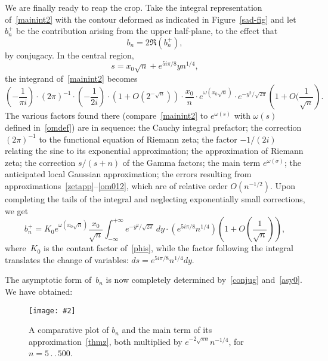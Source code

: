\documentclass{amsart}
\newcommand{\Img}[2]{\texttt{[image: \#2]}}
\begin{document}
We are finally ready to reap the crop. Take the integral representation
of~\eqref{mainint2} with the contour deformed as indicated in Figure~\ref{sad-fig} and
let $b_n^{+}$ be the contribution arising from the upper half-plane, to
the effect that
\begin{equation}\label{conjug}
b_n=2\Re(b_n^+),
\end{equation}
by conjugacy. In the central region, 
\[
s=x_0\sqrt{n}+e^{5i\pi/8}yn^{1/4},
\]
the integrand of~\eqref{mainint2} becomes
\begin{equation}\label{phis}
\left(-\frac{1}{\pi i}\right)\cdot 
(2\pi)^{-1}\cdot 
\left(-\frac{1}{2i}\right)\cdot
 \left(1+O(2^{-\sqrt{n}})\right)\cdot 
\frac{x_0}{n} \cdot e^{\omega(x_0\sqrt{n})} \cdot
e^{-y^2/\sqrt{2\pi}}\left(1+O(\frac{1}{\sqrt{n}}\right).
\end{equation}
The various factors found there (compare~\eqref{mainint2} to $e^{\omega(s)}$
with $\omega(s)$ defined in~\eqref{omdef})
are in sequence: the Cauchy integral prefactor; 
the correction $(2\pi)^{-1}$ to the functional equation of Riemann zeta;
the factor $-1/(2i)$ relating the sine to its
exponential approximation; the approximation of Riemann zeta;
the correction $s/(s+n)$ of the Gamma factors; 
the main term $e^{\omega(\sigma)}$;
the anticipated local Gaussian approximation;
the errors resulting from approximations~\eqref{zetapp}--\eqref{om012},
which are of relative order $O(n^{-1/2})$. Upon completing the tails of the 
integral and neglecting exponentially small corrections,
we get
\begin{equation}\label{asy0}
b_n^+ =K_0 e^{\omega(x_0\sqrt{n})}
\frac{x_0}{\sqrt{n}}
\int_{-\infty}^{+\infty} e^{-y^2/\sqrt{2\pi}}\,dy
\cdot\left(e^{5i\pi/8}n^{1/4}\right)\left(1+O\left(\frac{1}{\sqrt{n}}\right)\right),
\end{equation}
where~$K_0$    is the contant  factor  of~\eqref{phis}, while the factor
following   the integral   translates the   change   of   variables:
$ds=e^{5i\pi/8}n^{1/4}dy$. 

The  asymptotic form of~$b_n$ is now completely
determined by~\eqref{conjug} and~\eqref{asy0}.
We have obtained:

\begin{figure}
\begin{center}
\Img{7}{comparapp.jpg}
\end{center}
\caption{\label{comparapp-fig} A comparative plot of $b_n$ and 
the main term of its approximation~\eqref{thmz},
both multiplied by $e^{-2\sqrt{\pi n}}n^{-1/4}$, for $n=5\,.\,.\,500$.}
\end{figure}
\end{document}
